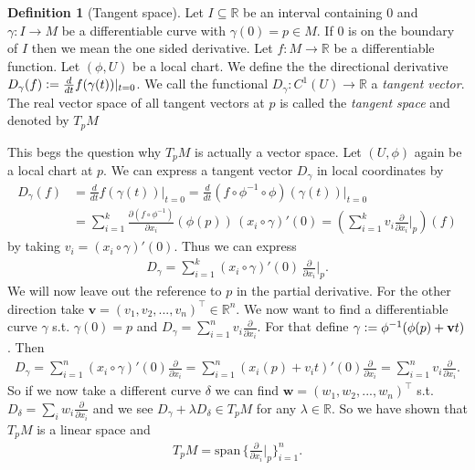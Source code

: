 \documentclass[12pt,a4paper]{article}
\numberwithin{equation}{subsection}
\numberwithin{lemma}{subsection}
\theoremstyle{definition}
\newtheorem{definition}[lemma]{Definition}
\newcommand{\real}{\mathbb{R}}
\begin{document}
\begin{definition}[Tangent space]
    Let $I \subseteq \real$ be an interval containing $0$ and 
    $\gamma: I \rightarrow M$ be a differentiable curve with $\gamma(0) = p \in M$.
    If $0$ is on the boundary of $I$ then we mean the one sided derivative.
    Let $f:M \rightarrow \real$ be a differentiable function. Let
    $(\phi,U)$ be a local chart.
    We define the the directional derivative 
    $D_\gamma(f) \vcentcolon= \frac{d}{dt} f(\gamma(t)) |_{t=0}$.
    We call the functional $D_\gamma: C^1(U) \rightarrow \real$ 
    a \textit{tangent vector}. 
    The real vector space of all tangent vectors at $p$ is called the 
    \textit{tangent space} and denoted by $T_p M$    
\end{definition}
This begs the question why $T_p M$ is actually a vector space. Let $(U,\phi)$ 
again be a local chart at $p$.
We can 
express a tangent vector $D_\gamma$ in local coordinates by 
\begin{align}
    D_\gamma(f) &=  \frac{d}{dt} f(\gamma(t)) \big|_{t=0}
    =  \frac{d}{dt} (f \circ \phi^{-1} \circ \phi)  (\gamma(t)) \big|_{t=0}
    \\ &= \sum\limits_{i=1}^k \frac{\partial (f \circ \phi^{-1})}{\partial x_i} 
        (\phi(p))
        \, (x_i\circ \gamma)'(0)
    = (\sum\limits_{i=1}^k v_i  \frac{\partial}{\partial x_i}\Big|_p )(f)
\end{align}
by taking $v_i = (x_i\circ \gamma)'(0)$. Thus we can express 
\begin{align*}
    D_\gamma = \sum\limits_{i=1}^k 
    (x_i \circ \gamma)' (0) \, \frac{\partial}{\partial x_i}\bigg|_p.
\end{align*}
We will now leave out the reference to $p$ in the partial derivative.
For the other direction take $\mathbf{v} = (v_1, v_2, ..., v_n)^\top \in \real^n$. 
We now want to find a differentiable curve $\gamma$ s.t. $\gamma(0) = p$ 
and $D_\gamma = \sum_{i=1}^n v_i \frac{\partial}{\partial x_i}$.
For that define $\gamma \vcentcolon= \phi^{-1} (\phi(p) + \mathbf{v}t)$.
Then
\begin{align*}
    D_\gamma = \sum_{i=1}^n (x_i\circ \gamma)'(0) \frac{\partial}{\partial x_i}
    = \sum_{i=1}^n (x_i(p) + v_i t)'(0) \frac{\partial}{\partial x_i}
    = \sum_{i=1}^n v_i \frac{\partial}{\partial x_i}.
\end{align*}
So if we now take a different curve $\delta$ we can find 
$\mathbf{w} = (w_1, w_2, ..., w_n)^\top$ s.t.
$D_\delta = \sum_i w_i \frac{\partial}{\partial x_i}$ and we see 
$D_\gamma + \lambda D_\delta \in T_p M$ for any $\lambda \in \real$.
So we have shown that $T_p M$ is a linear space and 
\begin{align*}
    T_p M = \text{span}\, 
        \bigg\{ \frac{\partial}{\partial x_i}\bigg|_p \bigg\}_{i=1}^n.
\end{align*}
\end{document}
